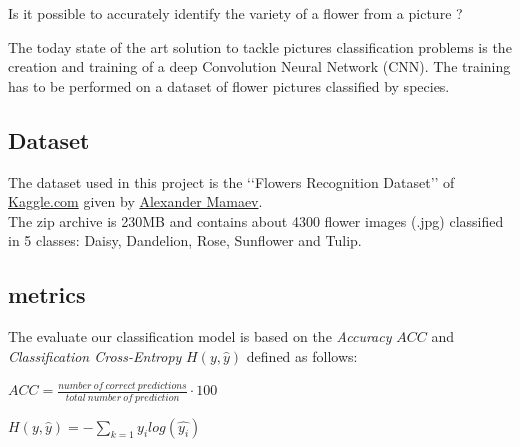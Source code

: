 Is it possible to accurately identify the variety of a flower from a picture ?

The today state of the art solution to tackle pictures classification problems is the creation and training of a deep Convolution Neural Network (CNN). The training has to be performed on a dataset  of flower pictures classified by species. 

\subsection{Dataset}

The dataset used in this project is the \lq\lq{}Flowers Recognition Dataset\rq\rq{} of  \href{https://www.kaggle.com/alxmamaev/flowers-recognition}{Kaggle.com}  given by \href{https://alxmamaev.github.io/}{Alexander Mamaev}.\\

The zip archive is 230MB and contains about 4300 flower images (.jpg) classified in 5 classes: Daisy, Dandelion, Rose, Sunflower and Tulip.

\subsection{metrics}

The evaluate our classification model is based on the \textit{Accuracy} $ACC$ and  \textit{Classification Cross-Entropy} $H(y, \hat{y})$ defined as follows: 

\begin{center}

	$ACC = \frac{number \ of \ correct \ predictions}{total \ number \ of \ prediction} \cdot 100$ \cite{sklearn_accuracy}

\end{center}

\begin{center}
$H(y, \hat{y})=-\sum_{k=1} y_i log(\hat{y_i})$ \cite{cross_enropy}

\end{center}
	